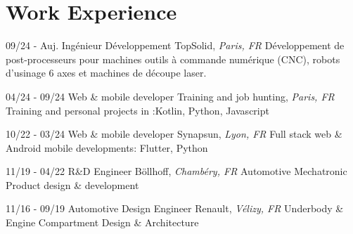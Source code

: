 \documentclass[]{friggeri-cv}
\begin{document}
\section{Work Experience}
\vspace*{-0.25cm}

\begin{entrylist}
  \entry
    {09/24 - Auj.}
    {Ingénieur Développement}
    {TopSolid, \textit{Paris, FR}}
    {Développement de post-processeurs pour machines outils à commande numérique (CNC), robots d'usinage 6 axes et machines de découpe laser.}
\end{entrylist}

\begin{entrylist}
  \entry
    {04/24 - 09/24}
    {Web \& mobile developer}
    {Training and job hunting, \textit{Paris, FR}}
    {Training and personal projects in :\hspace*{8mm}Kotlin, Python, Javascript}
\end{entrylist}

\begin{entrylist}
  \entry
    {10/22 - 03/24}
    {Web \& mobile developer}
    {Synapsun, \textit{Lyon, FR}}
    {Full stack web \& Android mobile developments: \hspace*{8mm}Flutter, Python}
\end{entrylist}

\begin{entrylist}
  \entry
    {11/19 - 04/22}
    {R\&D Engineer}
    {Böllhoff, \textit{Chambéry, FR}}
    {Automotive Mechatronic Product design \& development}
\end{entrylist}

\begin{entrylist}
  \entry
    {11/16 - 09/19}
    {Automotive Design Engineer}
    {Renault, \textit{Vélizy, FR}}
    {Underbody \& Engine Compartment Design \& Architecture}
\end{entrylist}

\vspace*{-0.5cm}
\vspace*{0.45cm}
\end{document}

